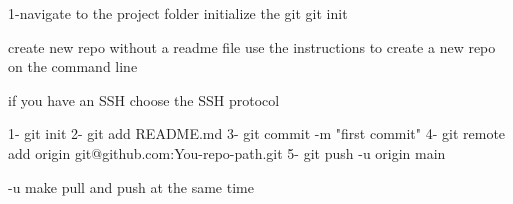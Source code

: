 1-navigate to the project folder 
initialize the git
  git init 

create new repo without a readme file 
use the instructions to create a new repo on the command line 

if you have an SSH choose the SSH protocol 

1- git init 
2- git add README.md 
3- git commit -m "first commit" 
4- git remote add origin git@github.com:You-repo-path.git 
5- git push -u origin main 

-u  make pull and push at the same time 